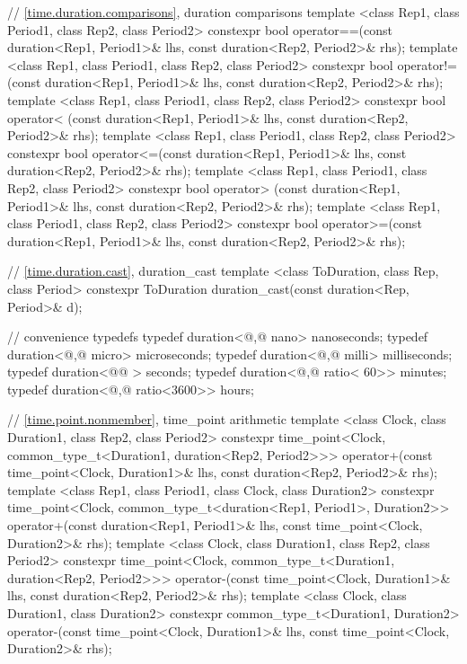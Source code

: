 \begin{codeblock}
{{// \ref{time.duration.comparisons}, duration comparisons
template <class Rep1, class Period1, class Rep2, class Period2>
  constexpr bool operator==(const duration<Rep1, Period1>& lhs,
                            const duration<Rep2, Period2>& rhs);
template <class Rep1, class Period1, class Rep2, class Period2>
  constexpr bool operator!=(const duration<Rep1, Period1>& lhs,
                            const duration<Rep2, Period2>& rhs);
template <class Rep1, class Period1, class Rep2, class Period2>
  constexpr bool operator< (const duration<Rep1, Period1>& lhs,
                            const duration<Rep2, Period2>& rhs);
template <class Rep1, class Period1, class Rep2, class Period2>
  constexpr bool operator<=(const duration<Rep1, Period1>& lhs,
                            const duration<Rep2, Period2>& rhs);
template <class Rep1, class Period1, class Rep2, class Period2>
  constexpr bool operator> (const duration<Rep1, Period1>& lhs,
                            const duration<Rep2, Period2>& rhs);
template <class Rep1, class Period1, class Rep2, class Period2>
  constexpr bool operator>=(const duration<Rep1, Period1>& lhs,
                            const duration<Rep2, Period2>& rhs);

// \ref{time.duration.cast}, duration_cast
template <class ToDuration, class Rep, class Period>
  constexpr ToDuration duration_cast(const duration<Rep, Period>& d);

// convenience typedefs
typedef duration<@,@        nano> nanoseconds;
typedef duration<@,@       micro> microseconds;
typedef duration<@,@       milli> milliseconds;
typedef duration<@@             > seconds;
typedef duration<@,@ ratio<  60>> minutes;
typedef duration<@,@ ratio<3600>> hours;

// \ref{time.point.nonmember}, time_point arithmetic
template <class Clock, class Duration1, class Rep2, class Period2>
  constexpr time_point<Clock, common_type_t<Duration1, duration<Rep2, Period2>>>
  operator+(const time_point<Clock, Duration1>& lhs, const duration<Rep2, Period2>& rhs);
template <class Rep1, class Period1, class Clock, class Duration2>
  constexpr time_point<Clock, common_type_t<duration<Rep1, Period1>, Duration2>>
  operator+(const duration<Rep1, Period1>& lhs, const time_point<Clock, Duration2>& rhs);
template <class Clock, class Duration1, class Rep2, class Period2>
  constexpr time_point<Clock, common_type_t<Duration1, duration<Rep2, Period2>>>
  operator-(const time_point<Clock, Duration1>& lhs, const duration<Rep2, Period2>& rhs);
template <class Clock, class Duration1, class Duration2>
  constexpr common_type_t<Duration1, Duration2>
  operator-(const time_point<Clock, Duration1>& lhs, const time_point<Clock, Duration2>& rhs);

}}
\end{codeblock}
